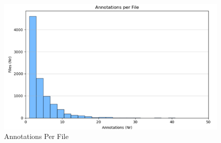 \documentclass{article}
\begin{document}
\begin{figure}[H]
  \centering
  \begin{minipage}{0.32\textwidth}
    \centering
    \begin{table}[H]
      \caption{Per File Measures}
      \label{tab:per_file}
    \end{table}
  \end{minipage} \hfill
  \begin{minipage}{0.2\textwidth}
    \centering
    \includegraphics[width=\textwidth]{figures/annotation_quality/annotations_per_file.png}
    \caption{Annotations Per File}
    \label{fig:annotations_per_file}
  \end{minipage} \hfill
  \begin{minipage}{0.2\textwidth}
    \centering

\end{minipage}
\end{figure}
\end{document}
